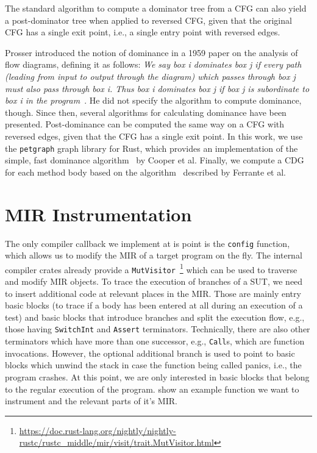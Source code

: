 \documentclass[paper=a4,%
  twoside,%
  BCOR4mm,%
  abstract=true,%
  toc=bibliography,%
  chapterprefix=true,%
  toc=bibliographynumbered,%
  open=right,%
  english,%
  pagesize=pdftex]{scrreprt}
\newcommand{\mir}{\ac{MIR}\xspace}
\newcommand{\cfg}{\ac{CFG}\xspace}
\begin{document}
The standard algorithm to compute a dominator tree from a \cfg can also yield a post-dominator tree when applied to reversed \cfg, given that the original \cfg has a single exit point, i.e., a single entry point with reversed edges.

Prosser introduced the notion of dominance in a 1959 paper on the analysis of flow diagrams, defining it as follows:
\emph{We say box i dominates box j if every path (leading from input to output through the diagram) which passes through box j must also pass through box i. Thus box i dominates box j if box j is subordinate to box i in the program}~\cite{Prosser1959}. He did not specify the algorithm to compute dominance, though. Since then, several algorithms for calculating dominance have been presented. Post-dominance can be computed the same way on a \cfg with reversed edges, given that the \cfg has a single exit point. In this work, we use the \texttt{petgraph} graph library for Rust, which provides an implementation of the simple, fast dominance algorithm~\cite{Cooper2001} by Cooper et al. Finally, we compute a \ac{CDG} for each method body based on the algorithm~\cite{Ferrante1987} described by Ferrante et al.

\section{MIR Instrumentation}
The only compiler callback we implement at is point is the \texttt{config} function, which allows us to modify the \mir of a target program on the fly. The internal compiler crates already provide a \texttt{MutVisitor}~\footnote{\url{https://doc.rust-lang.org/nightly/nightly-rustc/rustc_middle/mir/visit/trait.MutVisitor.html}} which can be used to traverse and modify \mir objects. To trace the execution of branches of a \ac{SUT}, we need to insert additional code at relevant places in the \mir. Those are mainly entry basic blocks (to trace if a body has been entered at all during an execution of a test) and basic blocks that introduce branches and split the execution flow, e.g., those having \texttt{SwitchInt} and \texttt{Assert} terminators. Technically, there are also other terminators which have more than one successor, e.g., \texttt{Call}s, which are function invocations. However, the optional additional branch is used to point to basic blocks which unwind the stack in case the function being called panics, i.e., the program crashes. At this point, we are only interested in basic blocks that belong to the regular execution of the program.  show an example function we want to instrument and the relevant parts of it's \mir.
\end{document}
